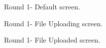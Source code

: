 \documentclass{report}
\begin{document}
\begin{figure}
\caption{Round 1- Default screen.}
\end{figure}

\begin{figure}
\caption{Round 1- File Uploading screen.}
\end{figure}

\begin{figure}
\caption{Round 1- File Uploaded screen.}
\end{figure}
\end{document}
